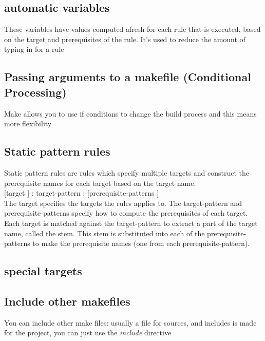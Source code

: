 \documentclass{article}
\begin{document}
\subsection{automatic variables}
These variables have values computed afresh for each rule that is executed, based on the target and prerequisites of the rule. It’s used to reduce the amount of typing in for a rule


\subsection{Passing arguments to a makefile (Conditional Processing)}
Make allows you to use if conditions to change the build process and this means more flexibility



\subsection{Static pattern rules}
Static pattern rules are rules which specify multiple targets and construct the prerequisite names for each
target based on the target name.\\

{[target ]} : target-pattern : {[prerequisite-patterns ]}\\

The target specifies the targets the rules applies to. The target-pattern and prerequisite-patterns specify
how to compute the prerequisites of each target. Each target is matched against the target-pattern to
extract a part of the target name, called the stem. This stem is substituted into each of the
prerequisite-patterns to make the prerequisite names (one from each prerequisite-pattern).




\subsection{special targets}

\subsection{Include other makefiles}
You can include other make files: usually a file for sources, and includes is made for the project, you can just use the \textit{include} directive
\end{document}
